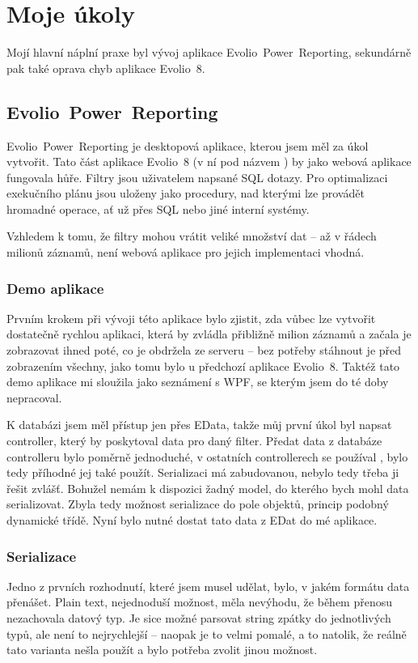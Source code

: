 \documentclass[czech,bachelor,dept460,male,csharp]{diploma}
\newcommand{\EvolioEight}{Evolio~8}
\newcommand{\EFilters}{Evolio~Power~Reporting}
\newcommand{\EData}{EData}
\begin{document}
\section{Moje úkoly}
	Mojí hlavní náplní praxe byl vývoj aplikace {\EFilters}, sekundárně pak také oprava chyb aplikace {\EvolioEight}.
	\subsection{\EFilters}
		{\EFilters} je desktopová aplikace, kterou jsem měl za úkol vytvořit. Tato část aplikace {\EvolioEight} (v ní pod názvem ) by jako webová aplikace fungovala hůře.
		Filtry jsou uživatelem napsané SQL dotazy. Pro optimalizaci exekučního plánu jsou uloženy jako procedury, nad kterými lze provádět hromadné operace, ať už přes SQL nebo jiné interní systémy.
		
		Vzhledem k tomu, že filtry mohou vrátit veliké množství dat – až v řádech milionů záznamů, není webová aplikace pro jejich implementaci vhodná.
		\subsubsection{Demo aplikace}
			Prvním krokem při vývoji této aplikace bylo zjistit, zda vůbec lze vytvořit dostatečně rychlou aplikaci, která by zvládla přibližně milion záznamů a začala je zobrazovat ihned poté, co je obdržela ze serveru – bez potřeby stáhnout je před zobrazením všechny, jako tomu bylo u předchozí aplikace {\EvolioEight}.
			Taktéž tato demo aplikace mi sloužila jako seznámení s WPF, se kterým jsem do té doby nepracoval.
			
			K databázi jsem měl přístup jen přes {\EData}, takže můj první úkol byl napsat controller, který by poskytoval data pro daný filter. Předat data z databáze controlleru bylo poměrně jednoduché, v ostatních controllerech se používal , bylo tedy příhodné jej také použít. Serializaci má zabudovanou, nebylo tedy třeba ji řešit zvlášť. Bohužel nemám k dispozici žadný model, do kterého bych mohl data serializovat. Zbyla tedy možnost serializace do pole objektů, princip podobný dynamické třídě. Nyní bylo nutné dostat tato data z EDat do mé aplikace.
		\subsubsection{Serializace}
			Jedno z prvních rozhodnutí, které jsem musel udělat, bylo, v jakém formátu data přenášet. Plain text, nejednoduší možnost, měla nevýhodu, že během přenosu nezachovala datový typ. Je sice možné parsovat string zpátky do jednotlivých typů, ale není to nejrychlejší -- naopak je to velmi pomalé, a to natolik, že reálně tato varianta nešla použít a bylo potřeba zvolit jinou možnost.
			
\end{document}
